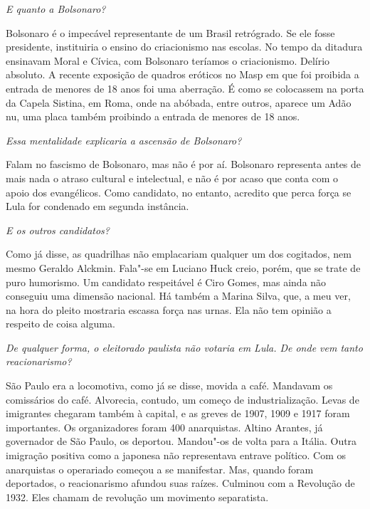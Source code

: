 \itshape
 E quanto a Bolsonaro?

\normalfont
Bolsonaro é o impecável representante de um Brasil
retrógrado. Se ele fosse presidente, instituiria o ensino do
criacionismo nas escolas. No tempo da ditadura ensinavam Moral e Cívica,
com Bolsonaro teríamos o criacionismo. Delírio absoluto. A recente
exposição de quadros eróticos no Masp em que foi proibida a entrada de
menores de 18 anos foi uma aberração. É como se colocassem na porta da
Capela Sistina, em Roma, onde na abóbada, entre outros, aparece um Adão
nu, uma placa também proibindo a entrada de menores de 18 anos.

\itshape
 Essa mentalidade explicaria a ascensão de Bolsonaro?

\normalfont
Falam no fascismo de Bolsonaro, mas não é por aí.
Bolsonaro representa antes de mais nada o atraso cultural e intelectual,
e não é por acaso que conta com o apoio dos evangélicos. Como candidato,
no entanto, acredito que perca força se Lula for condenado em segunda
instância.

\itshape
 E os outros candidatos?

\normalfont
Como já disse, as quadrilhas não emplacariam qualquer um
dos cogitados, nem mesmo Geraldo Alckmin. Fala"-se em Luciano Huck creio,
porém, que se trate de puro humorismo. Um candidato respeitável é Ciro
Gomes, mas ainda não conseguiu uma dimensão nacional. Há também a Marina
Silva, que, a meu ver, na hora do pleito mostraria escassa força nas
urnas. Ela não tem opinião a respeito de coisa alguma.

\itshape
 De qualquer forma, o eleitorado paulista não votaria em
Lula. De onde vem tanto reacionarismo?

\normalfont
São Paulo era a locomotiva, como já se disse, movida a
café. Mandavam os comissários do café. Alvorecia, contudo, um começo de
industrialização. Levas de imigrantes chegaram também à capital, e as
greves de 1907, 1909 e 1917 foram importantes. Os organizadores foram
400 anarquistas. Altino Arantes, já governador de São Paulo, os
deportou. Mandou"-os de volta para a Itália. Outra imigração positiva
como a japonesa não representava entrave político. Com os anarquistas o
operariado começou a se manifestar. Mas, quando foram deportados, o
reacionarismo afundou suas raízes. Culminou com a Revolução de 1932.
Eles chamam de revolução um movimento separatista.

